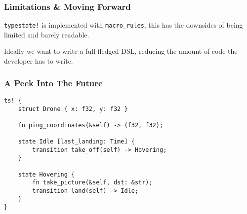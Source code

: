 \documentclass{beamer}
\begin{document}
\begin{frame}[fragile]
    \frametitle{Limitations \& Moving Forward}
    \texttt{typestate!} is implemented with \texttt{macro\_rules},
    this has the downsides of being limited and barely readable.

    Ideally we want to write a full-fledged DSL,
    reducing the amount of code the developer has to write.
\end{frame}

\begin{frame}[fragile]
    \frametitle{A Peek Into The Future}
    \begin{lstlisting}
ts! {
    struct Drone { x: f32, y: f32 }

    fn ping_coordinates(&self) -> (f32, f32);

    state Idle [last_landing: Time] {
        transition take_off(self) -> Hovering;
    }

    state Hovering {
        fn take_picture(&self, dst: &str);
        transition land(self) -> Idle;
    }
}
    \end{lstlisting}
\end{frame}
\end{document}
